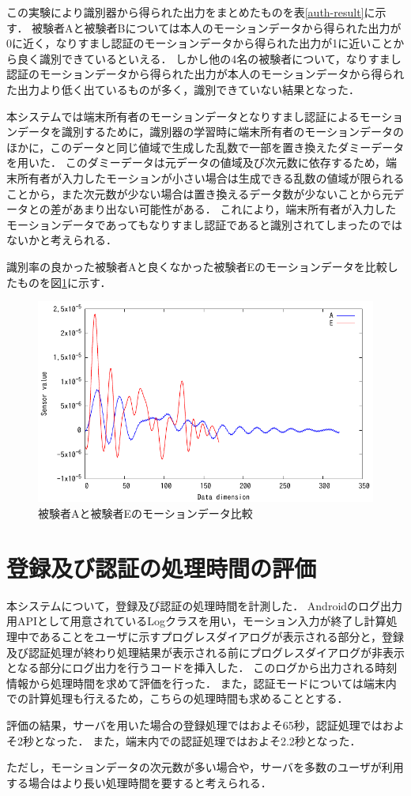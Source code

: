 この実験により識別器から得られた出力をまとめたものを表\ref{auth-result}に示す．
被験者Aと被験者Bについては本人のモーションデータから得られた出力が0に近く，なりすまし認証のモーションデータから得られた出力が1に近いことから良く識別できているといえる．
しかし他の4名の被験者について，なりすまし認証のモーションデータから得られた出力が本人のモーションデータから得られた出力より低く出ているものが多く，識別できていない結果となった．

本システムでは端末所有者のモーションデータとなりすまし認証によるモーションデータを識別するために，識別器の学習時に端末所有者のモーションデータのほかに，このデータと同じ値域で生成した乱数で一部を置き換えたダミーデータを用いた．
このダミーデータは元データの値域及び次元数に依存するため，端末所有者が入力したモーションが小さい場合は生成できる乱数の値域が限られることから，また次元数が少ない場合は置き換えるデータ数が少ないことから元データとの差があまり出ない可能性がある．
これにより，端末所有者が入力したモーションデータであってもなりすまし認証であると識別されてしまったのではないかと考えられる．

識別率の良かった被験者Aと良くなかった被験者Eのモーションデータを比較したものを図\ref{compare}に示す．

\begin{figure}[hbtp]
  \centering
  \includegraphics[bb=0 0 360 216, width=12cm]{Graphs/comp.pdf}
  \caption{被験者Aと被験者Eのモーションデータ比較}
  \label{compare}
\end{figure}

\section{登録及び認証の処理時間の評価}
本システムについて，登録及び認証の処理時間を計測した．
Androidのログ出力用APIとして用意されているLogクラス\cite{5-log}を用い，モーション入力が終了し計算処理中であることをユーザに示すプログレスダイアログが表示される部分と，登録及び認証処理が終わり処理結果が表示される前にプログレスダイアログが非表示となる部分にログ出力を行うコードを挿入した．
このログから出力される時刻情報から処理時間を求めて評価を行った．
また，認証モードについては端末内での計算処理も行えるため，こちらの処理時間も求めることとする．

評価の結果，サーバを用いた場合の登録処理ではおよそ65秒，認証処理ではおよそ2秒となった．
また，端末内での認証処理ではおよそ2.2秒となった．

ただし，モーションデータの次元数が多い場合や，サーバを多数のユーザが利用する場合はより長い処理時間を要すると考えられる．

